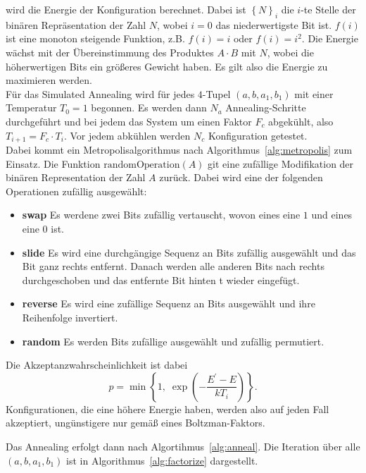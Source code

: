 wird die Energie der Konfiguration berechnet. Dabei ist ${\left\{N\right\}}_i$ die $i$-te Stelle der binären Repräsentation der Zahl $N$, wobei $i=0$ das niederwertigste Bit ist. $f\left(i\right)$ ist eine monoton steigende Funktion, z.B. $f\left(i\right)=i$ oder $f\left(i\right)=i^2$. Die Energie wächst mit der Übereinstimmung des Produktes $A\cdot B$ mit $N$, wobei die höherwertigen Bits ein größeres Gewicht haben. Es gilt also die Energie zu maximieren werden. \\
Für das Simulated Annealing wird für jedes $4$-Tupel $\left(a,b,a_1,b_1\right)$ mit einer Temperatur $T_0=1$ begonnen. Es werden dann $N_a$ Annealing-Schritte durchgeführt und bei jedem das System um einen Faktor $F_c$ abgekühlt, also $T_{i+1}=F_c\cdot T_i$. Vor jedem abkühlen werden $N_c$ Konfiguration getestet. \\
Dabei kommt ein Metropolisalgorithmus nach Algorithmus~\ref{alg:metropolis} zum Einsatz. Die Funktion $\mathrm{randomOperation}\left(A\right)$ git eine zufällige Modifikation der binären Representation der Zahl $A$ zurück. Dabei wird eine der folgenden Operationen zufällig ausgewählt:
\begin{itemize}
		\item \textbf{swap} Es werdene zwei Bits zufällig vertauscht, wovon eines eine $1$ und eines eine $0$ ist.
		\item \textbf{slide} Es wird eine durchgängige Sequenz an Bits zufällig ausgewählt und das Bit ganz rechts entfernt. Danach werden alle anderen Bits nach rechts durchgeschoben und das entfernte Bit hinten t wieder eingefügt.
		\item \textbf{reverse} Es wird eine zufällige Sequenz an Bits ausgewählt und ihre Reihenfolge invertiert.
		\item \textbf{random} Es werden Bits zufällige ausgewählt und zufällig permutiert.
\end{itemize}
Die Akzeptanzwahrscheinlichkeit ist dabei
\begin{equation*}
		p=\min\left\{1,\;\exp\left(-\frac{E^\prime-E}{k T_i}\right)\right\}.
\end{equation*}
Konfigurationen, die eine höhere Energie haben, werden also auf jeden Fall akzeptiert, ungünstigere nur gemäß eines Boltzman-Faktors.

Das Annealing erfolgt dann nach Algortihmus~\ref{alg:anneal}. Die Iteration über alle $\left(a,b,a_1,b_1\right)$ ist in Algorithmus~\ref{alg:factorize} dargestellt.


